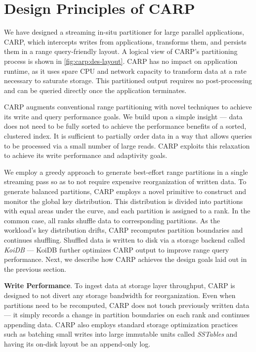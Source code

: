 \section{Design Principles of CARP}

We have designed a streaming in-situ partitioner for large parallel applications, CARP, which
intercepts writes from applications, transforms them, and persists them in a range query-friendly
layout.
A logical view of CARP's partitioning process is shown in \cref{fig:carp:des-layout}.
CARP has no impact on application runtime, as it uses spare CPU and network capacity to transform
data at a rate necessary to saturate storage.
This partitioned output requires no post-processing and can be queried directly once the
application terminates.

\figdeslayout

CARP augments conventional range partitioning with novel techniques to achieve its write and query
performance goals.
We build upon a simple insight --- data does not need to be fully sorted to achieve the performance
benefits of a sorted, clustered index.
It is sufficient to partially order data in a way that allows queries to be processed via a small
number of large reads.
CARP exploits this relaxation to achieve its write performance and adaptivity goals.

We employ a greedy approach to generate best-effort range partitions in a single streaming pass so
as to not require expensive reorganization of written data.
To generate balanced partitions, CARP employs a novel primitive to construct and monitor the global
key distribution.
This distribution is divided into partitions with equal areas under the curve, and each partition
is assigned to a rank.
In the common case, all ranks shuffle data to corresponding partitions.
As the workload's key distribution drifts, CARP recomputes partition boundaries and continues
shuffling.
Shuffled data is written to disk via a storage backend called \emph{KoiDB} --- KoiDB further
optimizes CARP output to improve range query performance.
Next, we describe how CARP achieves the design goals laid out in the previous section.

\textbf{Write Performance}.
To ingest data at storage layer throughput, CARP is designed to not divert any storage bandwidth
for reorganization.
Even when partitions need to be recomputed, CARP does not touch previously written data --- it
simply records a change in partition boundaries on each rank and continues appending data.
CARP also employs standard storage optimization practices such as batching small writes into large
immutable units called \emph{SSTables} and having its on-disk layout be an append-only log.

